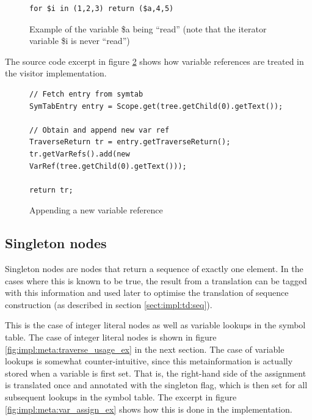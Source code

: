 \begin{figure}[!htp]
\begin{center}
\begin{Verbatim}
for $i in (1,2,3) return ($a,4,5)
\end{Verbatim}
  \caption{Example of the variable \$a being ``read'' (note that the iterator
  variable \$i is never ``read'')}
  \label{fig:impl:meta:var_ref_ex}
\end{center}
\end{figure}

The source code excerpt in figure \ref{fig:impl:meta:var_ref_impl2} shows how
variable references are treated in the visitor implementation.

\begin{figure}[!htp]
\begin{center}
\begin{Verbatim}
// Fetch entry from symtab
SymTabEntry entry = Scope.get(tree.getChild(0).getText());
            
// Obtain and append new var ref
TraverseReturn tr = entry.getTraverseReturn();
tr.getVarRefs().add(new VarRef(tree.getChild(0).getText()));

return tr;
\end{Verbatim}
  \caption{Appending a new variable reference}
  \label{fig:impl:meta:var_ref_impl2}
\end{center}
\end{figure}

\subsection{Singleton nodes}
Singleton nodes are nodes that return a sequence of exactly one element. In
the cases where this is known to be true, the result from a translation can be
tagged with this information and used later to optimise the translation of
sequence construction (as described in section \ref{sect:impl:td:seq}).

This is the case of integer literal nodes as well as variable lookups in the
symbol table. The case of integer literal nodes is shown in figure
\ref{fig:impl:meta:traverse_usage_ex} in the next section. The case of variable
lookups is somewhat counter-intuitive, since this metainformation is actually
stored when a variable is first set. That is, the right-hand side of the
assignment is translated once and annotated with the singleton flag, which is
then set for all subsequent lookups in the symbol table. The excerpt in figure
\ref{fig:impl:meta:var_assign_ex} shows how this is done in the implementation.

